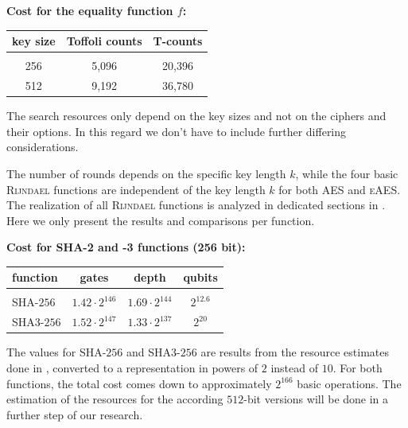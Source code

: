 \documentclass[a4paper,11pt]{article}
\begin{document}
\begin{otherlanguage}{english}
\begin{multicols}{2}
\begin{center}
\textbf{Cost for the equality function $f$:} \\
  \vspace{0.2cm}
  \begin{tabular}{c|c|c}
  key size & Toffoli counts & T-counts \\ 
  \hline
    &  &  \\ [-8pt]
  256               &    5,096                &  20,396    \\
  512               &    9,192                &  36,780     \\  
  \end{tabular} 
\end{center}

\noindent
The search resources only depend on the key sizes and not on the ciphers and their options. In this regard we don't have to include further differing considerations.

\noindent
The number of rounds depends on the specific key length $k$, while the four basic \textsc{Rijndael} functions are independent of the key length $k$ for both \textsc{AES} and \textsc{eAES}. The realization of all \textsc{Rijndael} functions is analyzed in dedicated sections in \cite{GRO}. Here we only present the results and comparisons per function.\\


\begin{center}
\textbf{Cost for SHA-2 and -3 functions (256 bit):} \\
\vspace{0.2cm}
  \begin{tabular}{l|c|c|c}
  function &  gates & depth & qubits \\ 
  \hline
    &  &  & \\ [-8pt]
  \textsc{SHA}-$256$ & $1.42 \cdot 2^{146}$ & $1.69 \cdot 2^{144}$ & $2^{12.6}$  \\  
  \textsc{SHA3}-$256$ & $1.52 \cdot 2^{147}$ & $1.33 \cdot 2^{137}$ & $2^{20}$  \\ 
  \end{tabular} 
\end{center}

\noindent
The values for \textsc{SHA}-$256$ and \textsc{SHA3}-$256$ are results from the resource estimates done in \cite{QSH}, converted to a representation in powers of $2$ instead of $10$. For both functions, the total cost comes down to approximately $2^{166}$ basic operations. The estimation of the resources for the according $512$-bit versions will be done in a further step of our research. \\


\end{multicols}
\end{otherlanguage}
\end{document}
